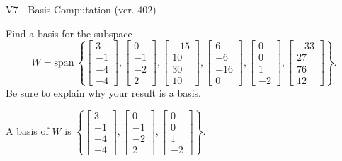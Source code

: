 \begin{exercise}
  \begin{exerciseTitle}V7 - Basis Computation (ver. 402)\end{exerciseTitle}
  \begin{exerciseStatement}
    Find a basis for the subspace 
\[W=\mathrm{span}\ \left\{\left[\begin{array}{r}
3 \\
-1 \\
-4 \\
-4
\end{array}\right] , \left[\begin{array}{r}
0 \\
-1 \\
-2 \\
2
\end{array}\right] , \left[\begin{array}{r}
-15 \\
10 \\
30 \\
10
\end{array}\right] , \left[\begin{array}{r}
6 \\
-6 \\
-16 \\
0
\end{array}\right] , \left[\begin{array}{r}
0 \\
0 \\
1 \\
-2
\end{array}\right] , \left[\begin{array}{r}
-33 \\
27 \\
76 \\
12
\end{array}\right]\right\}.\]
 Be sure to explain why your result is a basis.


  \end{exerciseStatement}
  \begin{exerciseAnswer}
   A basis of \(W\) is  \(\left\{\left[\begin{array}{r}
3 \\
-1 \\
-4 \\
-4
\end{array}\right] , \left[\begin{array}{r}
0 \\
-1 \\
-2 \\
2
\end{array}\right] , \left[\begin{array}{r}
0 \\
0 \\
1 \\
-2
\end{array}\right]\right\}\).
  


  \end{exerciseAnswer}
\end{exercise}
